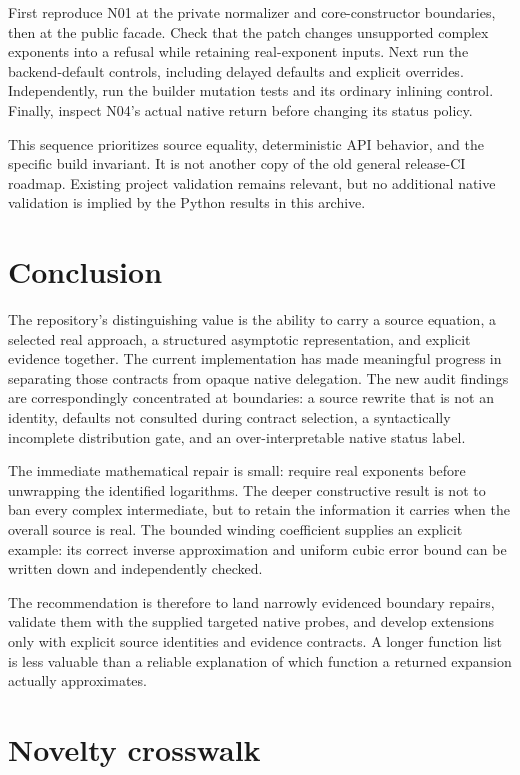 \documentclass[11pt,a4paper]{article}
\begin{document}
First reproduce N01 at the private normalizer and core-constructor boundaries,
then at the public facade. Check that the patch changes unsupported complex
exponents into a refusal while retaining real-exponent inputs. Next run the
backend-default controls, including delayed defaults and explicit overrides.
Independently, run the builder mutation tests and its ordinary inlining control.
Finally, inspect N04's actual native return before changing its status policy.

This sequence prioritizes source equality, deterministic API behavior, and the
specific build invariant. It is not another copy of the old general release-CI
roadmap. Existing project validation remains relevant, but no additional native
validation is implied by the Python results in this archive.

\section{Conclusion}

The repository's distinguishing value is the ability to carry a source equation,
a selected real approach, a structured asymptotic representation, and explicit
evidence together. The current implementation has made meaningful progress in
separating those contracts from opaque native delegation. The new audit findings
are correspondingly concentrated at boundaries: a source rewrite that is not an
identity, defaults not consulted during contract selection, a syntactically
incomplete distribution gate, and an over-interpretable native status label.

The immediate mathematical repair is small: require real exponents before
unwrapping the identified logarithms. The deeper constructive result is not to
ban every complex intermediate, but to retain the information it carries when
the overall source is real. The bounded winding coefficient supplies an explicit
example: its correct inverse approximation and uniform cubic error bound can be
written down and independently checked.

The recommendation is therefore to land narrowly evidenced boundary repairs,
validate them with the supplied targeted native probes, and develop extensions
only with explicit source identities and evidence contracts. A longer function
list is less valuable than a reliable explanation of which function a returned
expansion actually approximates.

\clearpage
\appendix
\section{Novelty crosswalk}
\end{document}
